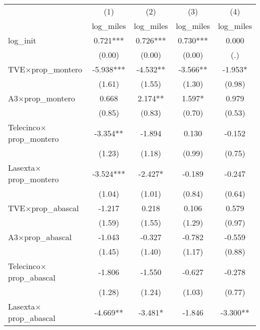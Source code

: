 \begin{tabular}{l*{4}{c}}
\toprule
                    &\multicolumn{1}{c}{(1)}&\multicolumn{1}{c}{(2)}&\multicolumn{1}{c}{(3)}&\multicolumn{1}{c}{(4)}\\
                    &\multicolumn{1}{c}{log\_miles}&\multicolumn{1}{c}{log\_miles}&\multicolumn{1}{c}{log\_miles}&\multicolumn{1}{c}{log\_miles}\\
\midrule
log\_init            &       0.721***&       0.726***&       0.730***&       0.000   \\
                    &      (0.00)   &      (0.00)   &      (0.00)   &         (.)   \\
TVE$\times$prop\_montero&      -5.938***&      -4.532** &      -3.566** &      -1.953*  \\
                    &      (1.61)   &      (1.55)   &      (1.30)   &      (0.98)   \\
A3$\times$prop\_montero&       0.668   &       2.174** &       1.597*  &       0.979   \\
                    &      (0.85)   &      (0.83)   &      (0.70)   &      (0.53)   \\
Telecinco$\times$prop\_montero&      -3.354** &      -1.894   &       0.130   &      -0.152   \\
                    &      (1.23)   &      (1.18)   &      (0.99)   &      (0.75)   \\
Lasexta$\times$prop\_montero&      -3.524***&      -2.427*  &      -0.189   &      -0.247   \\
                    &      (1.04)   &      (1.01)   &      (0.84)   &      (0.64)   \\
TVE$\times$prop\_abascal&      -1.217   &       0.218   &       0.106   &       0.579   \\
                    &      (1.59)   &      (1.55)   &      (1.29)   &      (0.97)   \\
A3$\times$prop\_abascal&      -1.043   &      -0.327   &      -0.782   &      -0.559   \\
                    &      (1.45)   &      (1.40)   &      (1.17)   &      (0.88)   \\
Telecinco$\times$prop\_abascal&      -1.806   &      -1.550   &      -0.627   &      -0.278   \\
                    &      (1.28)   &      (1.24)   &      (1.03)   &      (0.77)   \\
Lasexta$\times$prop\_abascal&      -4.669** &      -3.481*  &      -1.846   &      -3.300** \\

\end{tabular}
